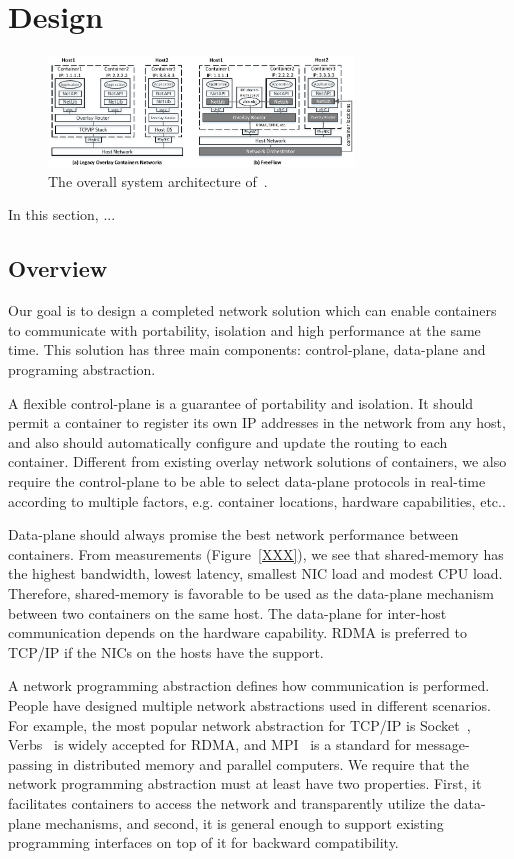 \section{Design} \label{sec:design}

\begin{figure}[t!] 
     \centering 
     \includegraphics[width=3.2in]{figures/system-arch} 
    \caption{\label{fig:sysarch} The overall system architecture of~\sysname.} 
\end{figure} 

In this section, ...

\subsection{Overview}

Our goal is to design a completed network solution which can enable containers
to communicate with portability, isolation and high performance at the same time.
This solution has three main components: control-plane, data-plane and programing
abstraction. 

A flexible control-plane is a guarantee of portability and isolation. 
It should permit a container to register its own IP addresses in the network
from any host, and also should automatically configure and update the routing 
to each container. Different from existing overlay network solutions of 
containers, we also require the control-plane to be able to select 
data-plane protocols in real-time according to multiple factors, 
e.g. container locations, hardware capabilities, etc..

Data-plane should always promise the best network performance between 
containers. From measurements (Figure~\ref{XXX}), 
we see that shared-memory has the highest
bandwidth, lowest latency, smallest NIC load and modest CPU load. 
Therefore, shared-memory is favorable to be used as the data-plane 
mechanism between two containers on the same host. 
The data-plane for inter-host communication
depends on the hardware capability. RDMA is preferred to TCP/IP if the NICs
on the hosts have the support.

A network programming abstraction defines how communication is performed.
People have designed multiple network abstractions used in different scenarios.
For example, the most popular network abstraction for TCP/IP is Socket~\cite{?},
Verbs~\cite{?} is widely accepted for RDMA, and MPI~\cite{?} is a standard for
message-passing in distributed memory and parallel computers. We require that
the network programming abstraction must at least have two
properties. First, it facilitates containers to access the network and 
transparently utilize the data-plane mechanisms, and second, it is general 
enough to support existing programming interfaces on top of it for backward 
compatibility.

